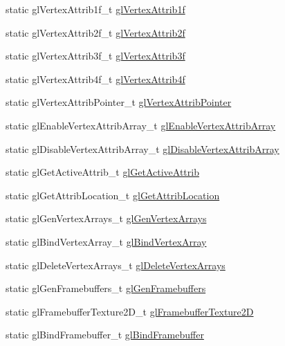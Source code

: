 \begin{DoxyCompactItemize}
\item 
static gl\+Vertex\+Attrib1f\+\_\+t \hyperlink{namespacetrimesh_a06e3f7b410269c788c0109c09153c38b}{gl\+Vertex\+Attrib1f}
\item 
static gl\+Vertex\+Attrib2f\+\_\+t \hyperlink{namespacetrimesh_a3fcd847b5ec9541c7e49163b19abf49f}{gl\+Vertex\+Attrib2f}
\item 
static gl\+Vertex\+Attrib3f\+\_\+t \hyperlink{namespacetrimesh_a2cb7297d0172b4d4f852af31b1ba28ff}{gl\+Vertex\+Attrib3f}
\item 
static gl\+Vertex\+Attrib4f\+\_\+t \hyperlink{namespacetrimesh_aa0b596fa07237d00a8c63baa033a8feb}{gl\+Vertex\+Attrib4f}
\item 
static gl\+Vertex\+Attrib\+Pointer\+\_\+t \hyperlink{namespacetrimesh_afd1f61dc31435df23ab80ae8e9946019}{gl\+Vertex\+Attrib\+Pointer}
\item 
static gl\+Enable\+Vertex\+Attrib\+Array\+\_\+t \hyperlink{namespacetrimesh_ab9fe47b6aceb987ab51a7e7106e3fc3e}{gl\+Enable\+Vertex\+Attrib\+Array}
\item 
static gl\+Disable\+Vertex\+Attrib\+Array\+\_\+t \hyperlink{namespacetrimesh_ad0fbc644f8ce0f65cc4b3b282251127d}{gl\+Disable\+Vertex\+Attrib\+Array}
\item 
static gl\+Get\+Active\+Attrib\+\_\+t \hyperlink{namespacetrimesh_a1a1349442b26f21511fd3bd9463a2888}{gl\+Get\+Active\+Attrib}
\item 
static gl\+Get\+Attrib\+Location\+\_\+t \hyperlink{namespacetrimesh_a9ae68276d32d8b3941185d0bb930e1d4}{gl\+Get\+Attrib\+Location}
\item 
static gl\+Gen\+Vertex\+Arrays\+\_\+t \hyperlink{namespacetrimesh_ac5f6da5e29e97f3bfef9958c64c1ca1e}{gl\+Gen\+Vertex\+Arrays}
\item 
static gl\+Bind\+Vertex\+Array\+\_\+t \hyperlink{namespacetrimesh_abd42c3d7c6aeceada13664ae96f7a080}{gl\+Bind\+Vertex\+Array}
\item 
static gl\+Delete\+Vertex\+Arrays\+\_\+t \hyperlink{namespacetrimesh_a522b40d23db2042458003087e4f6d5db}{gl\+Delete\+Vertex\+Arrays}
\item 
static gl\+Gen\+Framebuffers\+\_\+t \hyperlink{namespacetrimesh_a511f32d57e2febad74a3a9ab3e806dbb}{gl\+Gen\+Framebuffers}
\item 
static gl\+Framebuffer\+Texture2\+D\+\_\+t \hyperlink{namespacetrimesh_a2907a7c51bbb468e5adcf661c996ec66}{gl\+Framebuffer\+Texture2D}
\item 
static gl\+Bind\+Framebuffer\+\_\+t \hyperlink{namespacetrimesh_ae79828a2ea75f5d9c8727fba273f15a0}{gl\+Bind\+Framebuffer}

\end{DoxyCompactItemize}
